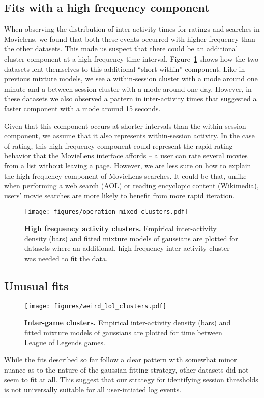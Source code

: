 \pagebreak
\subsection{Fits with a high frequency component}
When observing the distribution of inter-activity times for ratings and searches in Movielens, we found that both these events occurred with higher frequency than the other datasets.  This made us suspect that there could be an additional cluster component at a high frequency time interval.  Figure~\ref{fig:operation_mixed_clusters} shows how the two datasets lent themselves to this additional ``short within'' component.  Like in previous mixture models, we see a within-session cluster with a mode around one minute and a between-session cluster with a mode around one day.  However, in these datasets we also observed a pattern in inter-activity times that suggested a faster component with a mode around 15 seconds.

Given that this component occurs at shorter intervals than the within-session component, we assume that it also represents within-session activity.  In the case of rating, this high frequency component could represent the rapid rating behavior that the MovieLens interface affords -- a user can rate several movies from a list without leaving a page.  However, we are less sure on how to explain the high frequency component of MovieLens searches.  It could be that, unlike when performing a web search (AOL) or reading encyclopic content (Wikimedia), users' movie searches are more likely to benefit from more rapid iteration.
\begin{figure}
\centering
\texttt{[image: figures/operation\_mixed\_clusters.pdf]}
\caption{
    \textbf{High frequency activity clusters.} Empirical inter-activity density (bars) and fitted mixture models of gaussians are plotted for datasets where an additional, high-frequency inter-activity cluster was needed to fit the data.
}
\label{fig:operation_mixed_clusters}
\end{figure}

\subsection{Unusual fits}
\begin{figure}
\centering
\texttt{[image: figures/weird\_lol\_clusters.pdf]}
\caption{
    \textbf{Inter-game clusters.} Empirical inter-activity density (bars) and fitted mixture models of gaussians are plotted for time between League of Legends games.
}
\label{fig:lol_game_clusters}
\end{figure}
While the fits described so far follow a clear pattern with somewhat minor nuance as to the nature of the gaussian fitting strategy, other datasets did not seem to fit at all.  This suggest that our strategy for identifying session thresholds is not universally suitable for all user-intiated log events.

